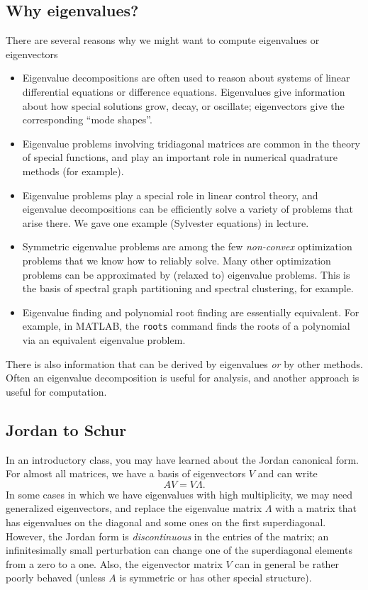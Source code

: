 \documentclass[12pt, leqno]{article}
\begin{document}
\subsection{Why eigenvalues?}

There are several reasons why we might want to compute
eigenvalues or eigenvectors
\begin{itemize}
\item
  Eigenvalue decompositions are often used to reason about systems of
  linear differential equations or difference equations.  Eigenvalues
  give information about how special solutions grow, decay, or
  oscillate; eigenvectors give the corresponding ``mode shapes''.
\item
  Eigenvalue problems involving tridiagonal matrices are common in
  the theory of special functions, and play an important role in
  numerical quadrature methods (for example).
\item
  Eigenvalue problems play a special role in linear control theory,
  and eigenvalue decompositions can be efficiently solve a variety of
  problems that arise there.  We gave one example (Sylvester
  equations) in lecture.
\item
  Symmetric eigenvalue problems are among the few {\em non-convex}
  optimization problems that we know how to reliably solve.  Many
  other optimization problems can be approximated by (relaxed to)
  eigenvalue problems.  This is the basis of spectral graph
  partitioning and spectral clustering, for example.
\item
  Eigenvalue finding and polynomial root finding are essentially
  equivalent.  For example, in MATLAB, the {\tt roots} command finds
  the roots of a polynomial via an equivalent eigenvalue problem.
\end{itemize}
There is also information that can be derived by eigenvalues {\em or}
by other methods.  Often an eigenvalue decomposition is useful for
analysis, and another approach is useful for computation.

\subsection{Jordan to Schur}

In an introductory class, you may have learned about the Jordan
canonical form.  For almost all matrices, we have a basis of
eigenvectors $V$ and can write
\[
  A V = V \Lambda.
\]
In some cases in which we have eigenvalues with high multiplicity,
we may need generalized eigenvectors, and replace the eigenvalue
matrix $\Lambda$ with a matrix that has eigenvalues on the diagonal
and some ones on the first superdiagonal.  However, the Jordan form
is {\em discontinuous} in the entries of the matrix; an
infinitesimally small perturbation can change one of the superdiagonal
elements from a zero to a one.  Also, the eigenvector matrix $V$ can
in general be rather poorly behaved (unless $A$ is symmetric or has
other special structure).
\end{document}
